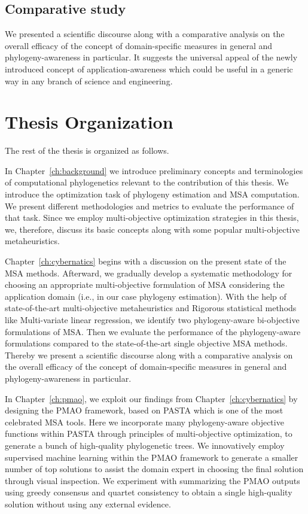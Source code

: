 \subsection{Comparative study}
 We presented a scientific discourse along with a comparative analysis on the overall efficacy of the concept of domain-specific measures in general and phylogeny-awareness in particular. It suggests the universal appeal of the newly introduced concept of application-awareness which could be useful in a generic way in any branch of science and engineering.



\section{Thesis Organization}

The rest of the thesis is organized as follows.

In Chapter~\ref{ch:background} we introduce preliminary concepts and terminologies of computational phylogenetics
relevant to the contribution of this thesis. We introduce the optimization task of phylogeny estimation and MSA computation. We present different methodologies and metrics to evaluate the performance of that task. Since we employ multi-objective optimization strategies in this thesis, we, therefore, discuss its basic concepts along with some popular multi-objective metaheuristics.

Chapter~\ref{ch:cybernatics} begins with a discussion on the present state of the MSA methods. Afterward, we gradually develop a systematic methodology for choosing an appropriate multi-objective formulation of MSA considering the application domain (i.e., in our case phylogeny estimation). With the help of state-of-the-art multi-objective metaheuristics and Rigorous statistical methods like Multi-variate linear regression, we identify two phylogeny-aware bi-objective formulations of MSA. Then we evaluate the performance of the phylogeny-aware formulations compared to the state-of-the-art single objective MSA methods. Thereby we present a scientific discourse along with a comparative analysis on the overall efficacy of the concept of domain-specific measures in general and phylogeny-awareness in particular.

In Chapter~\ref{ch:pmao}, we exploit our findings from Chapter~\ref{ch:cybernatics} by designing the PMAO framework, based on PASTA which is one of the most celebrated MSA tools. Here we incorporate many phylogeny-aware objective functions within PASTA through principles of multi-objective optimization, to generate a bunch of high-quality phylogenetic trees. We innovatively employ supervised machine learning within the PMAO framework to generate a smaller number of top solutions to assist the domain expert in choosing the final solution through visual inspection. We experiment with summarizing the PMAO outputs using greedy consensus and quartet consistency to obtain a single high-quality solution without using any external evidence.

